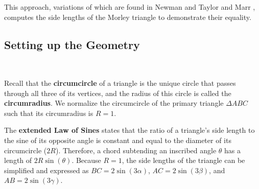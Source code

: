 \documentclass{amsart}
\begin{document}
	This approach, variations of which are found in Newman \cite{newman} and Taylor and Marr \cite{taylor}, computes the side lengths of the Morley triangle to demonstrate their equality. 
	
	\subsection{Setting up the Geometry}
	\mbox{} \\ 
	
	\noindent
	\begin{minipage}[t]{0.55\textwidth}
		\vspace{0pt} 
		Recall that the \textbf{circumcircle} of a triangle is the unique circle that passes through all three of its vertices, and the radius of this circle is called the \textbf{circumradius}. We normalize the circumcircle of the primary triangle $\Delta ABC$ such that its circumradius is $R = 1$.
		
		The \textbf{extended Law of Sines} states that the ratio of a triangle's side length to the sine of its opposite angle is constant and equal to the diameter of its circumcircle ($2R$). Therefore, a chord subtending an inscribed angle $\theta$ has a length of $2R\sin(\theta)$. Because $R = 1$, the side lengths of the triangle can be simplified and expressed as $BC = 2 \sin(3\alpha)$, $AC = 2 \sin(3\beta)$, and $AB = 2 \sin(3\gamma)$.
	\end{minipage}%
	\hfill
\end{document}
